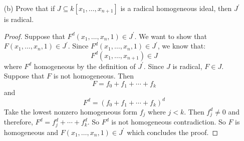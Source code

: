 \documentclass{article}
\begin{document}
\begin{itemize}
        \item [(b)] Prove that if $J \subseteq k[x_{1}, \ldots, x_{n + 1}]$ is a radical homogeneous ideal, then $J^{\prime}$ is radical.
            \begin{proof}
                Suppose that $F^{d}(x_{1}, \ldots, x_{n}, 1) \in J^{\prime}$. We want to show that $F(x_{1}, \ldots, x_{n}, 1) \in J^{\prime}$. Since $F^{d}(x_{1}, \ldots, x_{n}, 1) \in J^{\prime}$, we know that:
                    \begin{equation*}
                        F^{d}(x_{1}, \ldots, x_{n + 1}) \in J
                    \end{equation*}
                where $F^{d}$ homogeneous by the definition of $J^{\prime}$. Since $J$ is radical, $F \in J$. Suppose that $F$ is not homogeneous. Then 
                    \begin{equation*}
                        F = f_{0} + f_{1} + \cdots + f_{k}
                    \end{equation*}
                and
                    \begin{equation*}
                        F^{d} = (f_{0} + f_{1} + \cdots + f_{k})^{d}
                    \end{equation*}
                Take the lowest nonzero homogeneous form $f_{j}$ where $j < k$. Then $f_{j}^{d} \neq 0$ and therefore, $F^{d} = f_{j}^{d} + \cdots + f_{k}^{d}$. So $F^{d}$ is not homogeneous contradiction. So $F$ is homogeneous and $F(x_{1}, \ldots, x_{n}, 1) \in J^{\prime}$ which concludes the proof.
            \end{proof}


\end{itemize}
\end{document}
